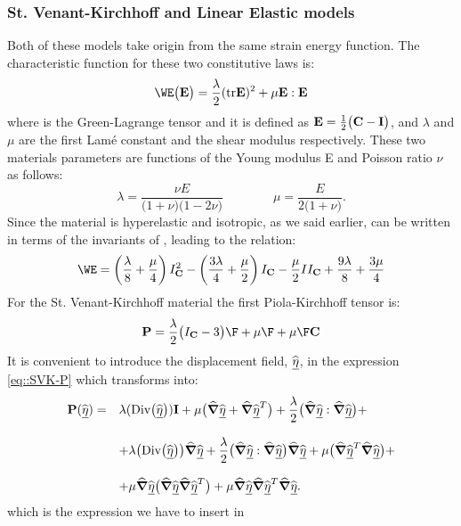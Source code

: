 \subsubsection{St. Venant-Kirchhoff and Linear Elastic models} Both of
these models take origin from the same strain energy function. The
characteristic function \W for these two constitutive laws is:
\begin{equation} \WE\big(\Et\big)=\frac{\lambda}{2}(\text{tr}\Et)^2 +
\mu\Et:\Et
\label{eq::W-SVKLE}
\end{equation} where \Et is the Green-Lagrange tensor and it is
defined as $\textbf{E}=\frac{1}{2}\big(\textbf{C}-\textbf{I}\big)$, and $\lambda$ and
$\mu$ are the first Lam\'e constant and the shear modulus
respectively. These two materials parameters are functions of the
Young modulus E and Poisson ratio $\nu$ as follows:
\begin{equation} \lambda=\frac{\nu E}{\big(1+\nu \big)\big(1-2\nu
\big)}\qquad\qquad \mu=\frac{E}{2\big(1+\nu\big)}.
  \label{eq::LameConst}
\end{equation} Since the material is hyperelastic and isotropic, as we
said earlier, \W can be written in terms of the invariants of \C,
leading to the relation:
\begin{equation}
\WE=\left(\frac{\lambda}{8}+\frac{\mu}{4}\right)I_{\C}^2 -
\left(\frac{3\lambda}{4}+\frac{\mu}{2}\right)I_{\C} -
\frac{\mu}{2}II_{\C}+\frac{9\lambda}{8}+\frac{3\mu}{4}
\label{eq::WSVK-Inv}
\end{equation} For the St. Venant-Kirchhoff material the first
Piola-Kirchhoff tensor is:
\begin{equation} \Piola = \frac{\lambda}{2}\big(I_{\C}-3\big)\F +
\mu\F +\mu\F\C
  \label{eq::SVK-P}
\end{equation} It is convenient to introduce the displacement field,
$\widehat{\underline{\eta}}$, in the expression \eqref{eq::SVK-P} which transforms into:
\begin{equation}
  \begin{array}{llll} \textbf{P}(\widehat{\underline{\eta}}) = & \displaystyle
\lambda(\text{Div}\big(\widehat{\underline{\eta}}\big))\textbf{I} + \mu\big(\widehat{\boldsymbol{\nabla}}\widehat{\underline{\eta}} +
\widehat{\boldsymbol{\nabla}}\widehat{\underline{\eta}}^T\big)
+\frac{\lambda}{2}\big(\widehat{\boldsymbol{\nabla}}\widehat{\underline{\eta}}:\widehat{\boldsymbol{\nabla}}\widehat{\underline{\eta}}\big)+ \\ \\ &
\displaystyle + \lambda\big(\text{Div}\big(\widehat{\underline{\eta}}\big)\big)\widehat{\boldsymbol{\nabla}}\widehat{\underline{\eta}} +
\frac{\lambda}{2}\big(\widehat{\boldsymbol{\nabla}}\widehat{\underline{\eta}}:\widehat{\boldsymbol{\nabla}}\widehat{\underline{\eta}}\big)\widehat{\boldsymbol{\nabla}}\widehat{\underline{\eta}} +
\mu\big(\widehat{\boldsymbol{\nabla}}\widehat{\underline{\eta}}^T \widehat{\boldsymbol{\nabla}}\widehat{\underline{\eta}}\big)+\\ \\ & \displaystyle +
\mu\widehat{\boldsymbol{\nabla}}\widehat{\underline{\eta}}\big(\widehat{\boldsymbol{\nabla}}\widehat{\underline{\eta}}\widehat{\boldsymbol{\nabla}}\widehat{\underline{\eta}}^T\big) +
\mu\widehat{\boldsymbol{\nabla}}\widehat{\underline{\eta}}\widehat{\boldsymbol{\nabla}}\widehat{\underline{\eta}}^T\widehat{\boldsymbol{\nabla}}\widehat{\underline{\eta}}.
  \end{array}
  \label{eq::SVK-P-displ}
\end{equation} which is the expression we have to insert in
